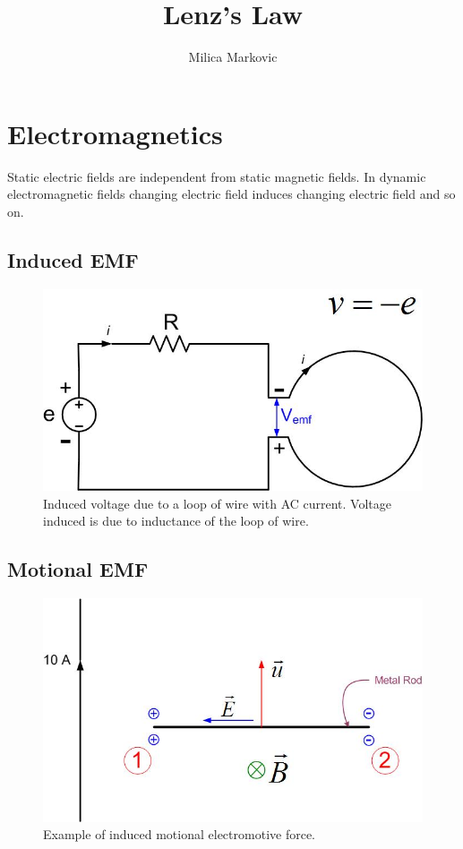 \documentclass{ximera}
\title{Lenz's Law}
\author{Milica Markovic}
\begin{document}
  
\begin{abstract}  

\end{abstract}  
\maketitle    


\section{Electromagnetics}

 Static electric fields are independent from static magnetic fields. In dynamic electromagnetic fields changing electric field induces changing electric field and so on. 



\subsection{Induced EMF}




\begin{figure}[htbp]
\begin{center}
\includegraphics[scale=0.5]{../jpg/inducedvoltage.jpg}
\end{center}
\caption{Induced voltage due to a loop of wire with AC current. Voltage induced is due to inductance of the loop of wire.}
\label{inducedemf}
\end{figure}




\subsection{Motional EMF}


\begin{figure}[htbp]
\begin{center}
\includegraphics[scale=0.5]{../jpg/motionalemf.jpg}
\end{center}
\caption{Example of induced motional electromotive force.}
\label{inducedemf}
\end{figure}
\end{document}

